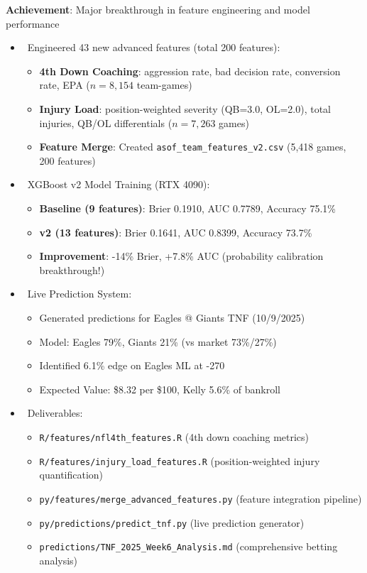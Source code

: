 \textbf{Achievement}: Major breakthrough in feature engineering and model performance
\begin{itemize}
  \item \done\ Engineered 43 new advanced features (total 200 features):
  \begin{itemize}
    \item \textbf{4th Down Coaching}: aggression rate, bad decision rate, conversion rate, EPA ($n=8,154$ team-games)
    \item \textbf{Injury Load}: position-weighted severity (QB=3.0, OL=2.0), total injuries, QB/OL differentials ($n=7,263$ games)
    \item \textbf{Feature Merge}: Created \texttt{asof\_team\_features\_v2.csv} (5,418 games, 200 features)
  \end{itemize}
  \item \done\ XGBoost v2 Model Training (RTX 4090):
  \begin{itemize}
    \item \textbf{Baseline (9 features)}: Brier 0.1910, AUC 0.7789, Accuracy 75.1\%
    \item \textbf{v2 (13 features)}: Brier 0.1641, AUC 0.8399, Accuracy 73.7\%
    \item \textbf{Improvement}: -14\% Brier, +7.8\% AUC (probability calibration breakthrough!)
  \end{itemize}
  \item \done\ Live Prediction System:
  \begin{itemize}
    \item Generated predictions for Eagles @ Giants TNF (10/9/2025)
    \item Model: Eagles 79\%, Giants 21\% (vs market 73\%/27\%)
    \item Identified 6.1\% edge on Eagles ML at -270
    \item Expected Value: \$8.32 per \$100, Kelly 5.6\% of bankroll
  \end{itemize}
  \item \done\ Deliverables:
  \begin{itemize}
    \item \texttt{R/features/nfl4th\_features.R} (4th down coaching metrics)
    \item \texttt{R/features/injury\_load\_features.R} (position-weighted injury quantification)
    \item \texttt{py/features/merge\_advanced\_features.py} (feature integration pipeline)
    \item \texttt{py/predictions/predict\_tnf.py} (live prediction generator)
    \item \texttt{predictions/TNF\_2025\_Week6\_Analysis.md} (comprehensive betting analysis)
  \end{itemize}
\end{itemize}

